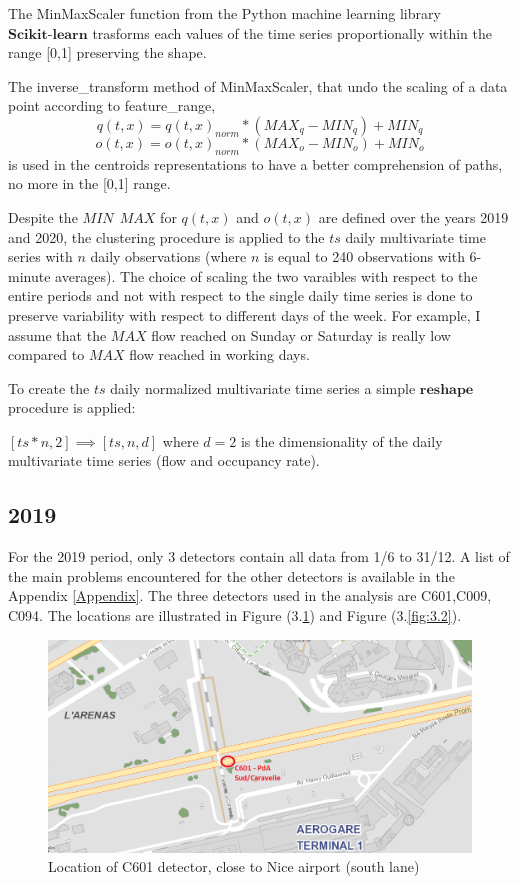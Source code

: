 \documentclass[11pt]{article}
\begin{document}
The MinMaxScaler function from the Python machine learning library
\(\textbf{Scikit-learn}\) \cite{pedregosa2011scikit} trasforms each
values of the time series proportionally within the range {[}0,1{]}
preserving the shape.

The inverse\_transform method of MinMaxScaler, that undo the scaling of
a data point according to feature\_range,
\[q(t,x)=q(t,x)_{norm}*(MAX_q-MIN_q)+ MIN_q\]
\[o(t,x)=o(t,x)_{norm}*(MAX_o-MIN_o)+ MIN_o\] is used in the centroids
representations to have a better comprehension of paths, no more in the
{[}0,1{]} range.

Despite the \(MIN \ \ MAX\) for \(q(t,x)\) and \(o(t,x)\) are defined
over the years 2019 and 2020, the clustering procedure is applied to the
\(ts\) daily multivariate time series with \(n\) daily observations
(where \(n\) is equal to 240 observations with 6-minute averages). The
choice of scaling the two varaibles with respect to the entire periods
and not with respect to the single daily time series is done to preserve
variability with respect to different days of the week. For example, I
assume that the \(MAX\) flow reached on Sunday or Saturday is really low
compared to \(MAX\) flow reached in working days.

To create the \(ts\) daily normalized multivariate time series a simple
\(\textbf{reshape}\) procedure is applied:

\([ts*n,2] \implies [ts,n,d]\) where \(d=2\) is the dimensionality of
the daily multivariate time series (flow and occupancy rate).

    \subsection{2019}

    For the 2019 period, only 3 detectors contain all data from 1/6 to
31/12. A list of the main problems encountered for the other detectors
is available in the Appendix \ref{Appendix}. The three detectors used in
the analysis are C601,C009, C094. The locations are illustrated in
Figure (3.\ref{fig:3.1}) and Figure (3.\ref{fig:3.2}).

    \begin{figure}
    \centering
    \includegraphics[scale=0.5]{terminal1.png}
    \caption{Location of C601 detector, close to Nice airport (south lane)}
    \label{fig:3.1}
\end{figure}
\end{document}
